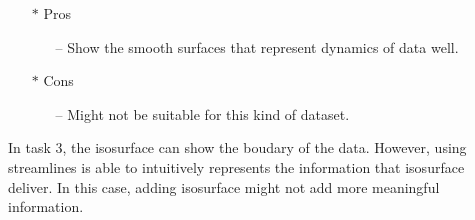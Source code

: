 \documentclass[11pt]{article}
\begin{document}
\begin{itemize}

\item [$\ast$] Pros

\begin{itemize}

\item [--] Show the smooth surfaces that represent dynamics of data well.

\end{itemize}

\item [$\ast$] Cons

\begin{itemize}

\item [--] Might not be suitable for this kind of dataset.

\end{itemize}

\end{itemize}

In task 3, the isosurface can show the boudary of the data. However, using streamlines is able to intuitively represents the information that isosurface deliver.  In this case, adding isosurface might not add more meaningful information.
\end{document}
